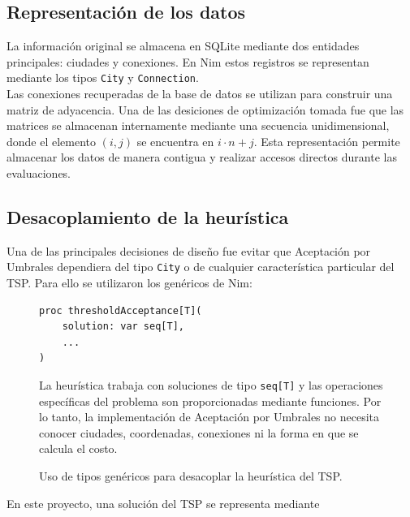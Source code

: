 \documentclass[twoside,11pt]{article}
\begin{document}
\subsection{Representación de los datos}

La información original se almacena en SQLite mediante dos entidades principales: ciudades y conexiones. En Nim estos registros se representan mediante los tipos \texttt{City} y \texttt{Connection}. \\

Las conexiones recuperadas de la base de datos se utilizan para construir una matriz de adyacencia. Una de las desiciones de optimización tomada fue que las matrices se almacenan internamente mediante una secuencia unidimensional, donde el elemento $(i,j)$ se encuentra en $i\cdot n+j$. Esta representación permite almacenar los datos de manera contigua y realizar accesos directos durante las evaluaciones.

\subsection{Desacoplamiento de la heurística}

Una de las principales decisiones de diseño fue evitar que Aceptación por Umbrales dependiera del tipo \texttt{City} o de cualquier característica particular del TSP. Para ello se utilizaron los genéricos de Nim:

\begin{figure}[H]
\centering

\begin{minipage}[t]{0.38\textwidth}
\begin{verbatim}
proc thresholdAcceptance[T](
    solution: var seq[T],
    ...
)
\end{verbatim}
\end{minipage}
\hfill
\begin{minipage}[t]{0.57\textwidth}
\small
La heurística trabaja con soluciones de tipo \texttt{seq[T]} y las operaciones específicas del problema son proporcionadas mediante funciones. Por lo tanto, la implementación de Aceptación por Umbrales no necesita conocer ciudades, coordenadas, conexiones ni la forma en que se calcula el costo.
\end{minipage}

\caption{Uso de tipos genéricos para desacoplar la heurística del TSP.}
\label{fig:generic-threshold}
\end{figure}

En este proyecto, una solución del TSP se representa mediante
\end{document}
